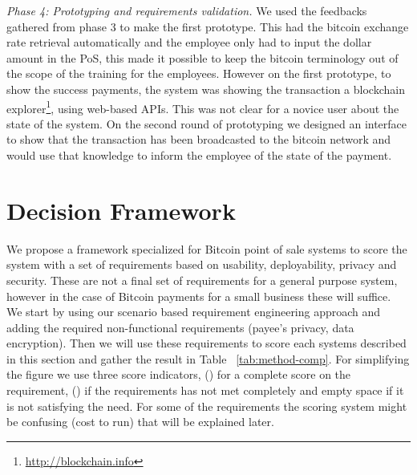 \textit{Phase 4: Prototyping and requirements validation.}
We used the feedbacks gathered from phase 3 to make the first prototype. This had the bitcoin exchange rate retrieval automatically and the employee only had to input the dollar amount in the PoS, this made it possible to keep the bitcoin terminology out of the scope of the training for the employees. However on the first prototype, to show the success payments, the system was showing the transaction a blockchain explorer\footnote{\url{http://blockchain.info}}, using web-based APIs. This was not clear for a novice user about the state of the system. On the second round of prototyping we designed an interface to show that the transaction has been broadcasted to the bitcoin network and would use that knowledge to inform the employee of the state of the payment.\\

\section{Decision Framework}
We propose a framework specialized for Bitcoin point of sale systems to score the system with a set of requirements based on usability, deployability, privacy and security. These are not a final set of requirements for a general purpose system, however in the case of Bitcoin payments for a small business these will suffice.\\
We start by using our scenario based requirement engineering approach and adding the required non-functional requirements (\eg payee's privacy, data encryption). Then we will use these requirements to score each systems described in this section and gather the result in Table ~\ref{tab:method-comp}. For simplifying the figure we use three score indicators,  (\full) for a complete score on the requirement, (\prt) if the requirements has not met completely and empty space if it is not satisfying the need. For some of the requirements the scoring system might be confusing (\eg cost to run) that will be explained later.

